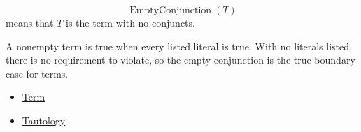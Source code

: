 \begin{remark*}
\[
\operatorname{EmptyConjunction}(T)
\]
means that \(T\) is the term with no conjuncts.
\end{remark*}

\begin{remark*}[Interpretation]
A nonempty term is true when every listed literal is true. With no literals
listed, there is no requirement to violate, so the empty conjunction is the true
boundary case for terms.
\end{remark*}

\begin{dependencies}
\begin{itemize}
  \item \hyperref[def:term-propositional-logic]{Term}
  \item \hyperref[def:tautology-propositional-logic]{Tautology}
\end{itemize}
\end{dependencies}
